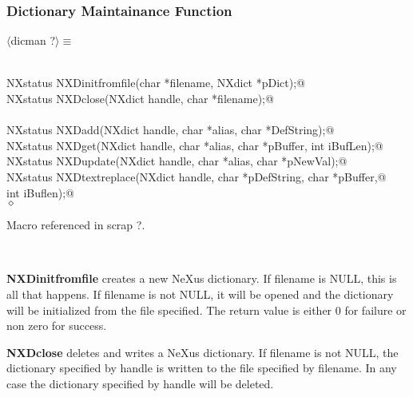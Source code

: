 \documentclass[12pt]{article}
\begin{document}
\subsubsection{Dictionary Maintainance Function}
\begin{flushleft} \small
\begin{minipage}{\linewidth} \label{scrap2}
$\langle$dicman {\footnotesize ?}$\rangle\equiv$
\vspace{-1ex}
\begin{list}{}{} \item
\mbox{}\verb@@\\
\mbox{}\verb@   NXstatus NXDinitfromfile(char *filename, NXdict *pDict);@\\
\mbox{}\verb@   NXstatus NXDclose(NXdict handle, char *filename);@\\
\mbox{}\verb@@\\
\mbox{}\verb@   NXstatus NXDadd(NXdict handle, char *alias, char *DefString);@\\
\mbox{}\verb@   NXstatus NXDget(NXdict handle, char *alias, char *pBuffer, int iBufLen);@\\
\mbox{}\verb@   NXstatus NXDupdate(NXdict handle, char *alias, char *pNewVal);@\\
\mbox{}\verb@   NXstatus NXDtextreplace(NXdict handle, char *pDefString, char *pBuffer,@\\
\mbox{}\verb@                           int iBuflen);@\\
\mbox{}\verb@@$\diamond$
\end{list}
\vspace{-1ex}
\footnotesize\addtolength{\baselineskip}{-1ex}
\begin{list}{}{\setlength{\itemsep}{-\parsep}\setlength{\itemindent}{-\leftmargin}}
\item Macro referenced in scrap ?.
\end{list}
\end{minipage}\\[4ex]
\end{flushleft}
{\bf NXDinitfromfile} creates a new NeXus dictionary. If filename is NULL, this
  is all that happens. If filename is not NULL, it will be opened and the
  dictionary will be initialized from the file specified.  The return value
  is either 0 for failure or non zero for success. 

  {\bf NXDclose} deletes and writes a NeXus dictionary. If filename is not NULL,
  the dictionary specified by handle is written to the file specified by
  filename. In any case the dictionary specified by handle will be deleted.
\end{document}
